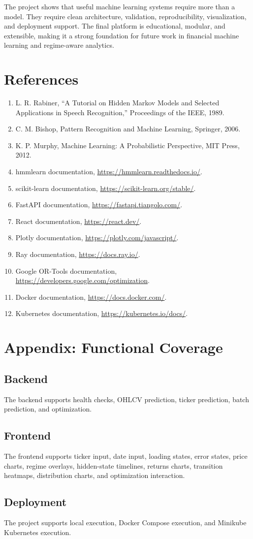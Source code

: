 \documentclass[12pt,a4paper]{report}
\begin{document}
The project shows that useful machine learning systems require more than a model. They require clean architecture, validation, reproducibility, visualization, and deployment support. The final platform is educational, modular, and extensible, making it a strong foundation for future work in financial machine learning and regime-aware analytics.

\chapter*{References}
\begin{enumerate}
    \item L. R. Rabiner, ``A Tutorial on Hidden Markov Models and Selected Applications in Speech Recognition,'' Proceedings of the IEEE, 1989.
    \item C. M. Bishop, Pattern Recognition and Machine Learning, Springer, 2006.
    \item K. P. Murphy, Machine Learning: A Probabilistic Perspective, MIT Press, 2012.
    \item hmmlearn documentation, \url{https://hmmlearn.readthedocs.io/}.
    \item scikit-learn documentation, \url{https://scikit-learn.org/stable/}.
    \item FastAPI documentation, \url{https://fastapi.tiangolo.com/}.
    \item React documentation, \url{https://react.dev/}.
    \item Plotly documentation, \url{https://plotly.com/javascript/}.
    \item Ray documentation, \url{https://docs.ray.io/}.
    \item Google OR-Tools documentation, \url{https://developers.google.com/optimization}.
    \item Docker documentation, \url{https://docs.docker.com/}.
    \item Kubernetes documentation, \url{https://kubernetes.io/docs/}.
\end{enumerate}

\appendix
\chapter{Appendix: Functional Coverage}
\section{Backend}
The backend supports health checks, OHLCV prediction, ticker prediction, batch prediction, and optimization.
\section{Frontend}
The frontend supports ticker input, date input, loading states, error states, price charts, regime overlays, hidden-state timelines, returns charts, transition heatmaps, distribution charts, and optimization interaction.
\section{Deployment}
The project supports local execution, Docker Compose execution, and Minikube Kubernetes execution.
\end{document}
